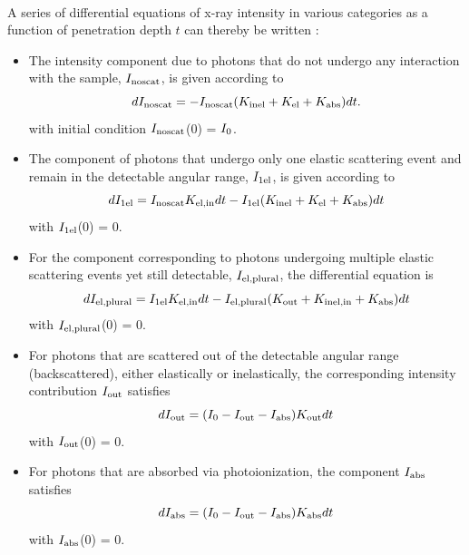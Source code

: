 \documentclass[review]{elsarticle}
\newcommand\nt{\textup{\scriptsize{0}}}
\newcommand\el{\textup{\scriptsize{el}}}
\newcommand\inel{\textup{\scriptsize{inel}}}
\newcommand\elin{\textup{\scriptsize{el,in}}}
\newcommand\inelin{\textup{\scriptsize{inel,in}}}
\newcommand\out{\textup{\scriptsize{out}}}
\newcommand\PI{\textup{\scriptsize{abs}}}
\newcommand\noscat{\textup{\scriptsize{noscat}}}
\newcommand\sel{\textup{\scriptsize{1el}}}
\newcommand\elpl{\textup{\scriptsize{el,plural}}}
\begin{document}
\paragraph{} A series of differential equations of x-ray intensity in various categories as a function of penetration depth $t$ can thereby be written \cite{Jacobsen:1998vj}:

\begin{itemize}

\item The intensity component due to photons that do not undergo any interaction with the sample, $I_{\noscat}$, is given according to
\begin{equation}
dI_{\noscat} = -I_{\noscat}(K_{\inel}+K_{\el}+K_{\PI}) dt.
\end{equation}
with initial condition $I_{\noscat}$(0) = $I_{\nt}$.

\item The component of photons that undergo only one elastic scattering event and remain in the detectable angular range, $I_{\sel}$, is given according to
\begin{equation}
dI_{\sel} = I_{\noscat}K_{\elin} dt - I_{\sel}(K_{\inel}+K_{\el}+K_{\PI}) dt
\end{equation}
with $I_{\sel}$(0) = 0.

\item For the component corresponding to photons undergoing multiple elastic scattering events yet still detectable, $I_{\elpl}$, the differential equation is
\begin{equation}
dI_{\elpl} = I_{\sel}K_{\elin} dt - I_{\elpl}(K_{\out}+K_{\inelin}+K_{\PI}) dt
\end{equation}
with $I_{\elpl}$(0) = 0.

\item For photons that are scattered out of the detectable angular range (backscattered), either elastically or inelastically, the corresponding intensity contribution $I_{\out}$ satisfies
\begin{equation}
dI_{\out} = (I_{\nt} - I_{\out} - I_{\PI})K_{\out} dt
\end{equation}
with $I_{\out}$(0) = 0.

\item For photons that are absorbed via photoionization, the component $I_{\PI}$ satisfies
\begin{equation}
dI_{\PI} = (I_{\nt} - I_{\out} - I_{\PI})K_{\PI} dt
\end{equation}
with $I_{\PI}$(0) = 0.


\end{itemize}
\end{document}
